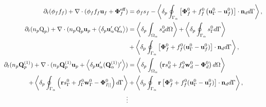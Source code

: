 \begin{align}
    \pddt (\phi_f f_f)
    +\div (\phi_f f_f \textbf{u}_f + \mathbf{\Phi}_f^\text{eff})
    &= 
    \phi_f s_f
    - \pSavg{\left[
        \mathbf{\Phi}_f^0
        + f_f^0
        \left(
            \textbf{u}_\Gamma^0
            - \textbf{u}_f^0
        \right)
    \right]
    \cdot \textbf{n}_d} ,
    \label{eq:avg_hybrid_dt_chi_f}\\
        \pddt (n_p\text Q_p)
        + \div (n_p \text Q_p \textbf{u}_p + \pavg{\textbf{u}_\alpha' \text Q_\alpha'})
        &= \pOavg{ s_d^0 }
        + \pSavg{ s_\Gamma^0 }\nonumber\\
        &+ \pSavg{ \left[\mathbf{\Phi}_f^0 + f_f^0 (\textbf{u}_\Gamma^0-\textbf{u}_f^0) \right] \cdot \textbf{n}_d },
        \label{eq:avg_hybrid_q}
        \\
        \pddt (n_p\textbf{Q}_p^{(1)})
        + \div (n_p \textbf{Q}_p^{(1)} \textbf{u}_p + \pavg{\textbf{u}_\alpha' (\textbf{Q}_\alpha^{(1)})'})
        &=\pOavg{ \left(
            \textbf{r} s_d^0         
            + f_d^0  \textbf{w}_d^0 
            - \mathbf{\Phi}_d^0
        \right) }\nonumber\\
        + \pSavg{ \left(
            \textbf{r}s_\Gamma^0
            + f_\Gamma^0 \textbf{w}_\Gamma^0
            - \mathbf{\Phi}_{I||}^0
        \right) }
        &+ \pSavg{ \textbf{r} \left[
            \mathbf{\Phi}_f^0
            + f_f^0 (\textbf{u}_\Gamma^0-\textbf{u}_f^0)
        \right]\cdot \textbf{n}_d  },
        \label{eq:avg_hybrid_q_1}
        \\\nonumber
        \vdots
\end{align}
